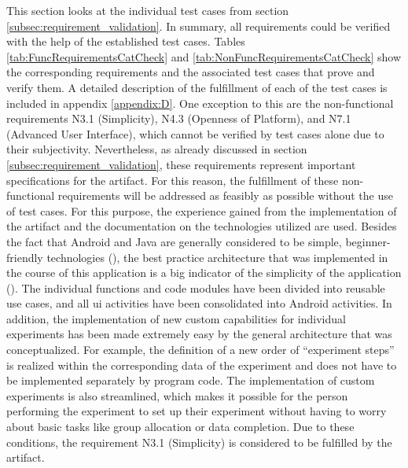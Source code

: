 This section looks at the individual test cases from section \ref{subsec:requirement_validation}. In summary, all requirements could be verified with the help of the established test cases. Tables \ref{tab:FuncRequirementsCatCheck} and \ref{tab:NonFuncRequirementsCatCheck} show the corresponding requirements and the associated test cases that prove and verify them. A detailed description of the fulfillment of each of the test cases is included in appendix \ref{appendix:D}. One exception to this are the non-functional requirements N3.1 (Simplicity), N4.3 (Openness of Platform), and N7.1 (Advanced User Interface), which cannot be verified by test cases alone due to their subjectivity. Nevertheless, as already discussed in section \ref{subsec:requirement_validation}, these requirements represent important specifications for the artifact. For this reason, the fulfillment of these non-functional requirements will be addressed as feasibly as possible without the use of test cases. For this purpose, the experience gained from the implementation of the artifact and the documentation on the technologies utilized are used. Besides the fact that Android and Java are generally considered to be simple, beginner-friendly technologies (\cite{Ullenboom.2017}), the best practice architecture that was implemented in the course of this application is a big indicator of the simplicity of the application (\cite{Google.2023}). The individual functions and code modules have been divided into reusable use cases, and all \ac{ui} activities have been consolidated into Android activities. In addition, the implementation of new custom capabilities for individual experiments has been made extremely easy by the general architecture that was conceptualized. For example, the definition of a new order of \enquote{experiment steps} is realized within the corresponding data of the experiment and does not have to be implemented separately by program code. The implementation of custom experiments is also streamlined, which makes it possible for the person performing the experiment to set up their experiment without having to worry about basic tasks like group allocation or data completion. Due to these conditions, the requirement N3.1 (Simplicity) is considered to be fulfilled by the artifact.

